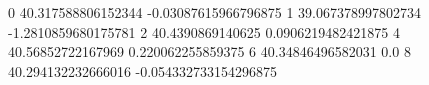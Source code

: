 0 40.317588806152344 -0.03087615966796875
1 39.067378997802734 -1.2810859680175781
2 40.4390869140625 0.0906219482421875
4 40.56852722167969 0.220062255859375
6 40.34846496582031 0.0
8 40.294132232666016 -0.054332733154296875
